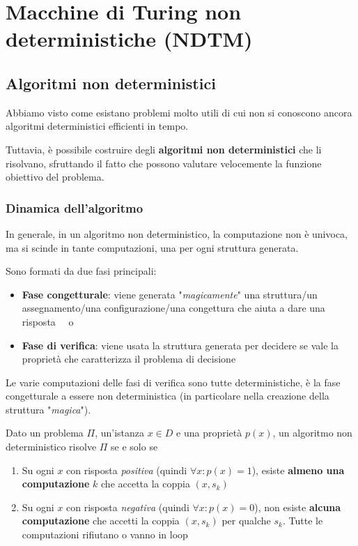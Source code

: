 \section{Macchine di Turing non deterministiche (NDTM)}

\subsection{Algoritmi non deterministici}

Abbiamo visto come esistano problemi molto utili di cui non si conoscono ancora algoritmi deterministici efficienti in tempo.

Tuttavia, è possibile costruire degli \textbf{algoritmi non deterministici} che li risolvano, sfruttando il fatto che possono valutare velocemente la funzione obiettivo del problema.

\subsubsection{Dinamica dell'algoritmo}

In generale, in un algoritmo non deterministico, la computazione non è univoca, ma si scinde in tante computazioni, una per ogni struttura generata.

Sono formati da due fasi principali: 
\begin{itemize}
	\item \textbf{Fase congetturale}: viene generata "\textit{magicamente}" una struttura/un assegnamento/una configurazione/una congettura che aiuta a dare una risposta \si\ o \no
    
	\item \textbf{Fase di verifica}: viene usata la struttura generata per decidere se vale la proprietà che caratterizza il problema di decisione
\end{itemize}

Le varie computazioni delle fasi di verifica sono tutte deterministiche, è la fase congetturale a essere non deterministica (in particolare nella creazione della struttura "\textit{magica}").

Dato un problema $\Pi$, un'istanza $x \in D$ e una proprietà $p(x)$, un algoritmo non deterministico risolve $\Pi$ se e solo se
\begin{enumerate}
	\item Su ogni $x$ con risposta \textit{positiva} (quindi $\forall x: p(x) = 1$), esiste \textbf{almeno una computazione} $k$ che accetta la coppia $(x, s_k)$
	
    \item Su ogni $x$ con risposta \textit{negativa} (quindi $\forall x: p(x) = 0$), non esiste \textbf{alcuna computazione} che accetti la coppia $(x, s_k)$ per qualche $s_k$. Tutte le computazioni rifiutano o vanno in loop
\end{enumerate}

